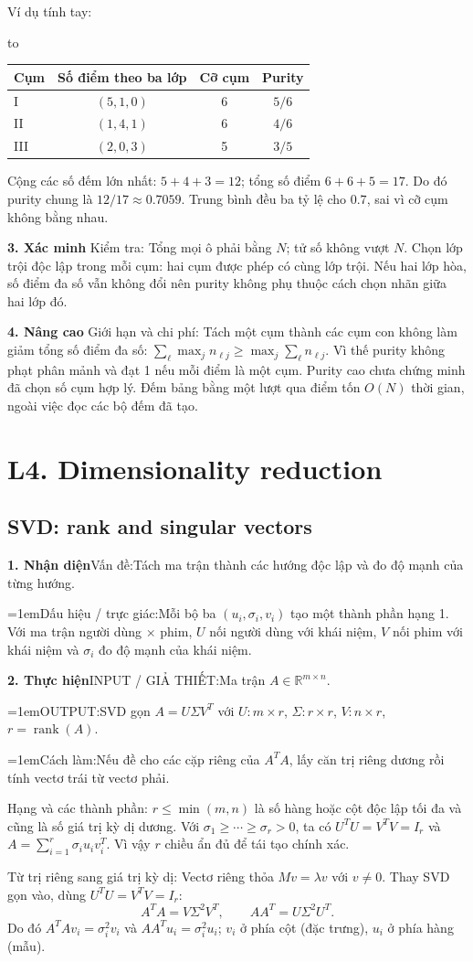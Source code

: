 \documentclass[10pt,a4paper,twocolumn]{article}
\newcommand{\lecture}[2]{%
  \par
  \section{L#1. #2}\label{lecture:#1}}
\newif\ifexamheadingprinted
\newcommand{\topic}[2]{%
  \global\examheadingprintedfalse\par\subsection{#2}\label{topic:#1}}
\newcommand{\key}[1]{#1:\enspace}
\newenvironment{examtable}[1]{%
  \par\addvspace{2pt}\noindent\hbox to \linewidth\bgroup\hfil
  \setlength{\tabcolsep}{4pt}%
  \renewcommand{\arraystretch}{1.12}\begin{tabular}{#1}%
}{\end{tabular}\hfil\egroup\par\addvspace{2pt}}
\newcommand{\algfield}[2]{\par\noindent\hangindent=1em\relax#1:\enspace#2}
\newcommand{\unitheading}[2]{%
  \par\addvspace{1pt}\noindent\textbf{#1. #2}\enspace}
\newcommand{\unitverification}{\unitheading{3}{Xác minh}}
\newcommand{\unitadvanced}{\unitheading{4}{Nâng cao}}
\newcommand{\unitfield}[4]{%
  \par\noindent\textbf{#1. #2}\enspace #3:\enspace #4}
\newcommand{\algsummary}[6]{%
  \begingroup\setlength{\parskip}{1pt}%
  \unitfield{1}{Nhận diện}{Vấn đề}{#1}%
  \algfield{Dấu hiệu / trực giác}{#2}%
  \if\relax\detokenize{#3}\relax\else\par\noindent#3\par\fi%
  \unitfield{2}{Thực hiện}{INPUT / GIẢ THIẾT}{#4}%
  \algfield{OUTPUT}{#5}%
  \algfield{Cách làm}{#6}\par\endgroup}
\begin{document}
\key{Ví dụ tính tay}
\begin{examtable}{@{}lccc@{}}
\toprule
Cụm & Số điểm theo ba lớp & Cỡ cụm & Purity \\
\midrule
I & $(5,1,0)$ & 6 & $5/6$ \\
II & $(1,4,1)$ & 6 & $4/6$ \\
III & $(2,0,3)$ & 5 & $3/5$ \\
\bottomrule
\end{examtable}
Cộng các số đếm lớn nhất: $5+4+3=12$; tổng số điểm $6+6+5=17$. Do đó purity chung là $12/17\approx0.7059$. Trung bình đều ba tỷ lệ cho $0.7$, sai vì cỡ cụm không bằng nhau.

\unitverification
\key{Kiểm tra} Tổng mọi ô phải bằng $N$; tử số không vượt $N$. Chọn lớp trội độc lập trong mỗi cụm: hai cụm được phép có cùng lớp trội. Nếu hai lớp hòa, số điểm đa số vẫn không đổi nên purity không phụ thuộc cách chọn nhãn giữa hai lớp đó.

\unitadvanced
\key{Giới hạn và chi phí} Tách một cụm thành các cụm con không làm giảm tổng số điểm đa số: $\sum_\ell\max_jn_{\ell j}\ge\max_j\sum_\ell n_{\ell j}$. Vì thế purity không phạt phân mảnh và đạt 1 nếu mỗi điểm là một cụm. Purity cao chưa chứng minh đã chọn số cụm hợp lý. Đếm bảng bằng một lượt qua điểm tốn $O(N)$ thời gian, ngoài việc đọc các bộ đếm đã tạo.

\lecture{4}{Dimensionality reduction}
\topic{svd}{SVD: rank and singular vectors}

\algsummary{Tách ma trận thành các hướng độc lập và đo độ mạnh của từng hướng.}{Mỗi bộ ba $(u_i,\sigma_i,v_i)$ tạo một thành phần hạng 1. Với ma trận người dùng $\times$ phim, $U$ nối người dùng với khái niệm, $V$ nối phim với khái niệm và $\sigma_i$ đo độ mạnh của khái niệm.}{}{Ma trận $A\in\mathbb R^{m\times n}$.}{SVD gọn $A=U\Sigma V^T$ với $U:m\times r$, $\Sigma:r\times r$, $V:n\times r$, $r=\operatorname{rank}(A)$.}{Nếu đề cho các cặp riêng của $A^TA$, lấy căn trị riêng dương rồi tính vectơ trái từ vectơ phải.}

\key{Hạng và các thành phần} $r\le\min(m,n)$ là số hàng hoặc cột độc lập tối đa và cũng là số giá trị kỳ dị dương. Với $\sigma_1\ge\cdots\ge\sigma_r>0$, ta có $U^TU=V^TV=I_r$ và $A=\sum_{i=1}^r\sigma_i u_i v_i^T$. Vì vậy $r$ chiều ẩn đủ để tái tạo chính xác.

\key{Từ trị riêng sang giá trị kỳ dị} Vectơ riêng thỏa $Mv=\lambda v$ với $v\ne0$. Thay SVD gọn vào, dùng $U^TU=V^TV=I_r$:
\[
A^TA=V\Sigma^2V^T,\qquad AA^T=U\Sigma^2U^T.
\]
Do đó $A^TA v_i=\sigma_i^2v_i$ và $AA^T u_i=\sigma_i^2u_i$; $v_i$ ở phía cột (đặc trưng), $u_i$ ở phía hàng (mẫu).
\end{document}
